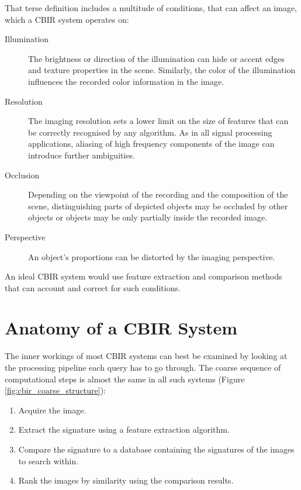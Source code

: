 That terse definition includes a multitude of conditions, that can affect an
image, which a CBIR system operates on:

\begin{description}
    \item[Illumination] The brightness or direction of the illumination can
        hide or accent edges and texture properties in the scene. Similarly,
        the color of the illumination influences the recorded color information
        in the image.
    \item[Resolution] The imaging resolution sets a lower limit on the size of
        features that can be correctly recognised by any algorithm. As in all
        signal processing applications, aliasing of high frequency components
        of the image can introduce further ambiguities.
        \autocite{shannon_communication_1998}
    \item[Occlusion] Depending on the viewpoint of the recording and the
        composition of the scene, distinguishing parts of depicted objects may
        be occluded by other objects or objects may be only partially inside
        the recorded image.
    \item[Perspective] An object's proportions can be distorted by the imaging
        perspective.
\end{description}

An ideal CBIR system would use feature extraction and comparison methods that
can account and correct for such conditions.

\section{Anatomy of a CBIR System}

The inner workings of most CBIR systems can best be examined by looking at the
processing pipeline each query has to go through. The coarse sequence of
computational steps is almost the same in all such systems (Figure
\ref{fig:cbir_coarse_structure}):

\begin{enumerate}
    \item Acquire the image.
    \item Extract the signature using a feature extraction algorithm.
    \item Compare the signature to a database containing the signatures of the
        images to search within.
    \item Rank the images by similarity using the comparison results.
\end{enumerate}

